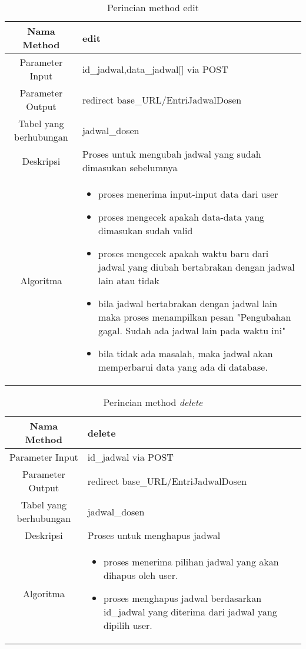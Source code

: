 \begin{center}
\begin{table}[H]
\caption{Perincian method edit}
\begin{tabular}{|c|p{11cm}|}
\hline
Nama Method 	& 	edit 	\\
\hline
Parameter Input & id\_jadwal,data\_jadwal[] via POST \\
\hline
Parameter Output & redirect base\_URL/EntriJadwalDosen \\
\hline
Tabel yang berhubungan & jadwal\_dosen \\
\hline
Deskripsi	& Proses untuk mengubah jadwal yang sudah dimasukan sebelumnya \\
\hline
Algoritma	& \begin{itemize}
				\item proses menerima input-input data dari user
				\item proses mengecek apakah data-data yang dimasukan sudah valid
				\item proses mengecek apakah waktu baru dari jadwal yang diubah bertabrakan dengan jadwal lain atau tidak
				\item bila jadwal bertabrakan dengan jadwal lain maka proses menampilkan pesan "Pengubahan gagal. Sudah ada jadwal lain pada waktu ini"
				\item bila tidak ada masalah, maka jadwal akan memperbarui data yang ada di database.
				\end{itemize} \\
\hline
\end{tabular}
\end{table}
\end{center}

\begin{center}
\begin{table}[H]
\caption{Perincian method \textit{delete}}
\begin{tabular}{|c|p{11cm}|}
\hline
Nama Method 	& 	delete 	\\
\hline
Parameter Input & id\_jadwal via POST \\
\hline
Parameter Output & redirect base\_URL/EntriJadwalDosen \\
\hline
Tabel yang berhubungan & jadwal\_dosen \\
\hline
Deskripsi	& Proses untuk menghapus jadwal \\
\hline
Algoritma	& \begin{itemize}
				\item proses menerima pilihan jadwal yang akan dihapus oleh user.
				\item proses menghapus jadwal berdasarkan id\_jadwal yang diterima dari jadwal yang dipilih user.
				\end{itemize} \\
\hline
\end{tabular}
\end{table}
\end{center}


